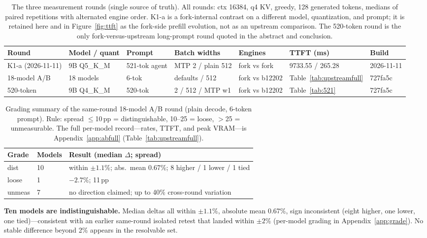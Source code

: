 \documentclass[letterpaper,twocolumn,10pt]{article}
\begin{document}
\begin{table}[t]
\centering
\scriptsize
\setlength{\tabcolsep}{4pt}
\begin{tabular}{@{}lllllll@{}}
\toprule
Round & Model / quant & Prompt & Batch widths & Engines & TTFT (ms) & Build \\
\midrule
K1-a (2026-11-11) & 9B Q5\_K\_M & 521-tok agent & MTP 2 / plain 512 & fork vs fork & 9733.55 / 265.28 & 2026-11-11 \\
18-model A/B & 18 models & 6-tok & defaults / 512 & fork vs b12202 & Table~\ref{tab:upstreamfull} & 727fa5c \\
520-token & 9B Q4\_K\_M & 520-tok & 2 / 512 / MTP w1 & fork vs b12202 & Table~\ref{tab:521} & 727fa5c \\
\bottomrule
\end{tabular}
\caption{The three measurement rounds (single source of truth). All rounds:
ctx 16384, q4 KV, greedy, 128 generated tokens, medians of paired repetitions
with alternated engine order. K1-a is a fork-internal contrast on a different
model, quantization, and prompt; it is retained here and in
Figure~\ref{fig:ttft} as the fork-side prefill evolution, not as an upstream
comparison. The 520-token round is the only fork-versus-upstream long-prompt
round quoted in the abstract and conclusion.}
\label{tab:rounds}
\end{table}

\begin{table}[t]
\centering
\small
\setlength{\tabcolsep}{3pt}
\begin{tabular}{@{}ll>{\raggedright\arraybackslash}p{}@{}}
\toprule
Grade & Models & Result (median $\Delta$; spread) \\
\midrule
dist & 10 & within $\pm1.1\%$; abs.\ mean 0.67\%; 8 higher / 1 lower / 1 tied \\
loose & 1 & $-2.7\%$; 11\,pp \\
unmeas & 7 & no direction claimed; up to 40\% cross-round variation \\
\bottomrule
\end{tabular}
\caption{Grading summary of the same-round 18-model A/B round (plain decode,
6-token prompt). Rule: spread $\le$10\,pp = distinguishable, 10--25 = loose,
$>$25 = unmeasurable. The full per-model record---rates, TTFT, and peak
VRAM---is Appendix~\ref{app:abfull} (Table~\ref{tab:upstreamfull}).}
\label{tab:upstream}
\end{table}

\textbf{Ten models are indistinguishable.} Median deltas all within
$\pm1.1\%$, absolute mean 0.67\%, sign inconsistent (eight higher, one lower,
one tied)---consistent with an earlier same-round isolated retest that landed
within $\pm2\%$ (per-model grading in Appendix~\ref{app:grade}). No stable
difference beyond 2\% appears in the resolvable set.
\end{document}

